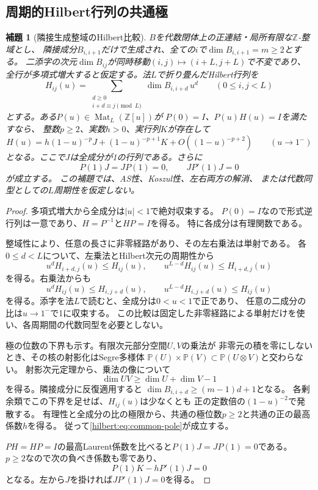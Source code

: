 \documentclass[11pt,a4paper]{ltjsarticle}
\newtheorem{lemma}[theorem]{補題}
\theoremstyle{definition}
\begin{document}
\subsection{周期的Hilbert行列の共通極}
\begin{lemma}[隣接生成整域のHilbert比較]\label{hilbert:lem:common-pole}
$B$を代数閉体上の正連結・局所有限な$\mathbb Z$-整域とし、
隣接成分$B_{i,i+1}$だけで生成され、全ての$i$で$\dim B_{i,i+1}=m\ge2$とする。
二添字の次元$\dim B_{ij}$が同時移動$(i,j)\mapsto(i+L,j+L)$で不変であり、
全行が多項式増大すると仮定する。法$L$で折り畳んだHilbert行列を
\[
 H_{ij}(u)=
 \sum_{\substack{d\ge0\\i+d\equiv j\pmod L}}\dim B_{i,i+d}\,u^d
 \qquad(0\le i,j<L)
\]
とする。ある$P(u)\in\operatorname{Mat}_L(\mathbb Z[u])$が
$P(0)=I$、$P(u)H(u)=I$を満たすなら、
整数$p\ge2$、実数$h>0$、実行列$K$が存在して
\begin{equation}\label{hilbert:eq:common-pole}
 H(u)=h(1-u)^{-p}J+(1-u)^{-p+1}K
       +O((1-u)^{-p+2})
 \qquad(u\to1^-)
\end{equation}
となる。ここで$J$は全成分が1の行列である。さらに
\begin{equation}\label{hilbert:eq:first-moments}
 P(1)J=JP(1)=0,\qquad JP'(1)J=0
\end{equation}
が成立する。
この補題では、AS性、Koszul性、左右両方の解消、
または代数同型としての$L$周期性を仮定しない。
\end{lemma}
\begin{proof}
多項式増大から全成分は$|u|<1$で絶対収束する。
$P(0)=I$なので形式逆行列は一意であり、$H=P^{-1}$と$HP=I$を得る。
特に各成分は有理関数である。

整域性により、任意の長さに非零経路があり、その左右乗法は単射である。
各$0\le d<L$について、左乗法とHilbert次元の周期性から
\[
 u^dH_{i+d,j}(u)\le H_{ij}(u),\qquad
 u^{L-d}H_{ij}(u)\le H_{i+d,j}(u)
\]
を得る。右乗法からも
\[
 u^dH_{ij}(u)\le H_{i,j+d}(u),\qquad
 u^{L-d}H_{i,j+d}(u)\le H_{ij}(u)
\]
を得る。添字を法$L$で読むと、全成分は$0<u<1$で正であり、
任意の二成分の比は$u\to1^-$で1に収束する。
この比較は固定した非零経路による単射だけを使い、各周期間の代数同型を必要としない。

極の位数の下界も示す。有限次元部分空間$U,V$の乗法が
非零元の積を零にしないとき、その核の射影化はSegre多様体
$\mathbb P(U)\times\mathbb P(V)\subset\mathbb P(U\otimes V)$と交わらない。
射影次元定理から、乗法の像について
\[
 \dim UV\ge\dim U+\dim V-1
\]
を得る。隣接成分に反復適用すると
$\dim B_{i,i+d}\ge(m-1)d+1$となる。
各剰余類でこの下界を足せば、$H_{ij}(u)$は少なくとも
正の定数倍の$(1-u)^{-2}$で発散する。
有理性と全成分の比の極限から、共通の極位数$p\ge2$と共通の正の最高係数$h$を得る。
従って\eqref{hilbert:eq:common-pole}が成立する。

$PH=HP=I$の最高Laurent係数を比べると$P(1)J=JP(1)=0$である。
$p\ge2$なので次の負べき係数も零であり、
\[
 P(1)K-hP'(1)J=0
\]
となる。左から$J$を掛ければ$JP'(1)J=0$を得る。
\end{proof}
\end{document}
